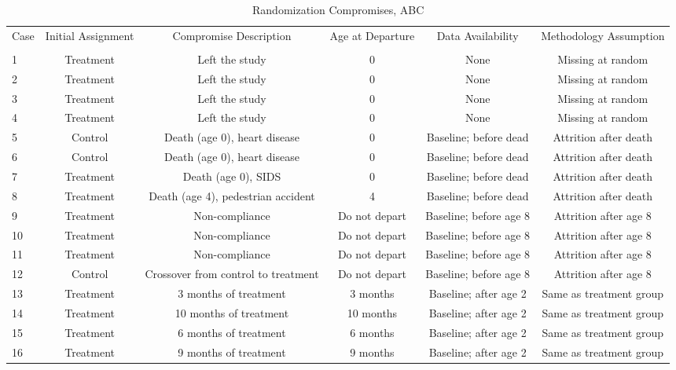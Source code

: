 \begin{sidewaystable}[H] 
\begin{threeparttable}
\caption{Randomization Compromises, ABC}
\label{table:abccompromises}
\centering
\footnotesize
\begin{tabular}{lccccc} \toprule
Case & Initial Assignment & Compromise Description & Age at Departure & Data Availability & Methodology Assumption \\ \\ \midrule
1& Treatment & Left the study & 0 & None & Missing at random \\
2& Treatment & Left the study & 0 &  None & Missing at random \\
3& Treatment & Left the study & 0 &  None & Missing at random \\
4& Treatment & Left the study & 0 &  None & Missing at random \\ \midrule
5& Control  & Death (age 0), heart disease & 0 &  Baseline; before dead & Attrition after death \\
6&Control  & Death (age 0), heart disease & 0 &  Baseline; before dead & Attrition after death \\
7&Treatment & Death (age 0), SIDS & 0 &  Baseline; before dead & Attrition after death \\
8&Treatment  & Death (age 4), pedestrian accident & 4 &  Baseline; before dead & Attrition after death \\ \midrule
9&Treatment  & Non-compliance  & Do not depart &  Baseline; before age 8 & Attrition after age 8  \\
10&Treatment  & Non-compliance  & Do not depart&  Baseline; before age 8 & Attrition after age 8  \\
11&Treatment  & Non-compliance  & Do not depart &  Baseline; before age 8 & Attrition after age 8  \\ \midrule
12&Control        & Crossover from control to treatment & Do not depart &  Baseline; before age 8 & Attrition after age 8  \\ \midrule
13&Treatment   & 3 months of treatment & 3 months &   Baseline; after age 2 & Same as treatment group  \\  
14&Treatment &10 months of treatment & 10 months &   Baseline; after age 2 & Same as treatment group  \\
15&Treatment & 6 months of treatment &  6 months &   Baseline; after age 2 & Same as treatment group  \\ 
16&Treatment & 9 months of treatment & 9 months  &   Baseline; after age 2 & Same as treatment group  \\  \midrule

\end{tabular}
\end{threeparttable}
\end{sidewaystable}
